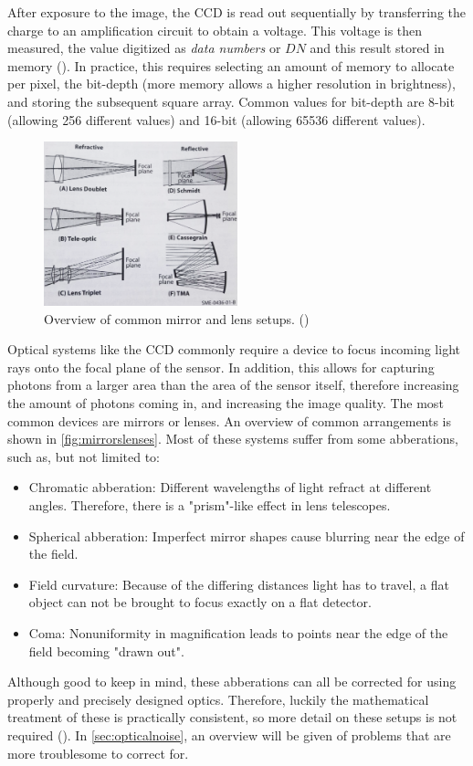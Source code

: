After exposure to the image, the CCD is read out sequentially by transferring the charge to an amplification circuit to obtain a voltage. This voltage is then measured, the value digitized as \textit{data numbers} or $DN$ and this result stored in memory (\cite{CCDBook}). In practice, this requires selecting an amount of memory to allocate per pixel, the bit-depth (more memory allows a higher resolution in brightness), and storing the subsequent square array. Common values for bit-depth are 8-bit (allowing 256 different values) and 16-bit (allowing 65536 different values).\\

\begin{figure}[htbp]
    \centering
    \includegraphics[width=0.5\textwidth]{images/mirrorlens.png}
    \caption{Overview of common mirror and lens setups. (\cite{SMAD})}
    \label{fig:mirrorslenses}
\end{figure}

Optical systems like the CCD commonly require a device to focus incoming light rays onto the focal plane of the sensor. In addition, this allows for capturing photons from a larger area than the area of the sensor itself, therefore increasing the amount of photons coming in, and increasing the image quality. The most common devices are mirrors or lenses. An overview of common arrangements is shown in \autoref{fig:mirrorslenses}. Most of these systems suffer from some abberations, such as, but not limited to:
\begin{itemize}
    \item Chromatic abberation: Different wavelengths of light refract at different angles. Therefore, there is a "prism"-like effect in lens telescopes.
    \item Spherical abberation: Imperfect mirror shapes cause blurring near the edge of the field.
    \item Field curvature: Because of the differing distances light has to travel, a flat object can not be brought to focus exactly on a flat detector.
    \item Coma: Nonuniformity in magnification leads to points near the edge of the field becoming "drawn out".
\end{itemize}
Although good to keep in mind, these abberations can all be corrected for using properly and precisely designed optics. Therefore, luckily the mathematical treatment of these is practically consistent, so more detail on these setups is not required (\cite{SMAD}). In \autoref{sec:opticalnoise}, an overview will be given of problems that are more troublesome to correct for.

